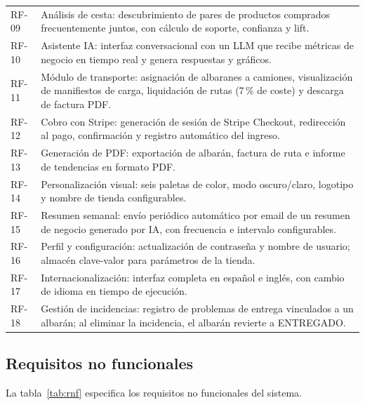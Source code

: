 \documentclass[12pt,twoside,titlepage]{report}
\begin{document}
\begin{longtable}{lp{11cm}}
  RF-09 & Análisis de cesta: descubrimiento de pares de productos comprados frecuentemente juntos, con cálculo de soporte, confianza y lift. \\
  RF-10 & Asistente IA: interfaz conversacional con un LLM que recibe métricas de negocio en tiempo real y genera respuestas y gráficos. \\
  RF-11 & Módulo de transporte: asignación de albaranes a camiones, visualización de manifiestos de carga, liquidación de rutas (7\,\% de coste) y descarga de factura PDF. \\
  RF-12 & Cobro con Stripe: generación de sesión de Stripe Checkout, redirección al pago, confirmación y registro automático del ingreso. \\
  RF-13 & Generación de PDF: exportación de albarán, factura de ruta e informe de tendencias en formato PDF. \\
  RF-14 & Personalización visual: seis paletas de color, modo oscuro/claro, logotipo y nombre de tienda configurables. \\
  RF-15 & Resumen semanal: envío periódico automático por email de un resumen de negocio generado por IA, con frecuencia e intervalo configurables. \\
  RF-16 & Perfil y configuración: actualización de contraseña y nombre de usuario; almacén clave-valor para parámetros de la tienda. \\
  RF-17 & Internacionalización: interfaz completa en español e inglés, con cambio de idioma en tiempo de ejecución. \\
  RF-18 & Gestión de incidencias: registro de problemas de entrega vinculados a un albarán; al eliminar la incidencia, el albarán revierte a ENTREGADO. \\
  \bottomrule
\end{longtable}

\subsection{Requisitos no funcionales}

La tabla~\ref{tab:rnf} especifica los requisitos no funcionales del sistema.
\end{document}
